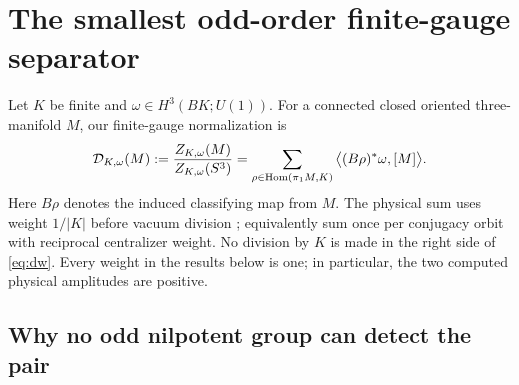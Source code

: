 \section{The smallest odd-order finite-gauge separator}\label{sec:sep}

Let \(K\) be finite and \(\omega\in H^3(BK;U(1))\).
For a connected closed oriented three-manifold \(M\), our finite-gauge
normalization is
\begin{equation}\label{eq:dw}
 \mathcal D_{K,\omega}(M):=\frac{Z_{K,\omega}(M)}{Z_{K,\omega}(S^3)}
 =\sum_{\rho\in\operatorname{Hom}(\pi_1 M,K)}
      \big\langle (B\rho)^*\omega,[M]\big\rangle .
\end{equation}
Here \(B\rho\) denotes the induced classifying map from \(M\).
The physical sum uses weight \(1/|K|\) before vacuum division
\cite{DW,FQ}; equivalently sum once per conjugacy orbit with
reciprocal centralizer weight. No division by \(K\) is made in the
right side of \eqref{eq:dw}. Every weight in the results below is one;
in particular, the two computed physical amplitudes are positive.

\subsection{Why no odd nilpotent group can detect the pair}


